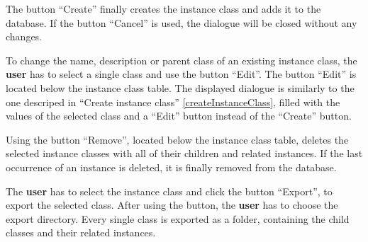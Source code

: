 The button ``Create'' finally creates the instance class and adds it to the \edacc database. \attention If the button ``Cancel'' is used, the dialogue will be closed without any changes.

 To change the name, description or parent class of an existing instance class, the \textbf{user} has to select a single class and use the button ``Edit''. The button ``Edit'' is located below the instance class table. The displayed dialogue is similarly to the one descriped in ``Create instance class'' \ref{createInstanceClass}, filled with the values of the selected class and a ``Edit'' button instead of the ``Create'' button.

 Using the button ``Remove'', located below the instance class table, deletes the selected instance classes with all of their children and related instances.  If the last occurrence of an instance is deleted, it is finally removed from the database.

 The \textbf{user} has to select the instance class and click the button ``Export'', to export the selected class. After using the button, the \textbf{user} has to choose the export directory. Every single class is exported as a folder, containing the child classes and  their related instances.


